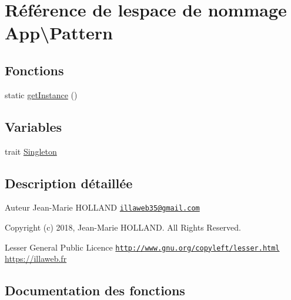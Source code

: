 \hypertarget{namespace_app_1_1_pattern}{}\section{Référence de l\textquotesingle{}espace de nommage App\textbackslash{}Pattern}
\label{namespace_app_1_1_pattern}
\subsection*{Fonctions}
\begin{DoxyCompactItemize}
\item 
static \hyperlink{namespace_app_1_1_pattern_a0c11e0e56c6a5589b98f956835d91862}{get\+Instance} ()
\end{DoxyCompactItemize}
\subsection*{Variables}
\begin{DoxyCompactItemize}
\item 
trait \hyperlink{namespace_app_1_1_pattern_a90c7994df18fc2d358849f9a46502bc1}{Singleton}
\end{DoxyCompactItemize}


\subsection{Description détaillée}
\begin{DoxyAuthor}{Auteur}
Jean-\/\+Marie H\+O\+L\+L\+A\+ND \href{mailto:illaweb35@gmail.com}{\tt illaweb35@gmail.\+com} 
\end{DoxyAuthor}
\begin{DoxyCopyright}{Copyright}
(c) 2018, Jean-\/\+Marie H\+O\+L\+L\+A\+ND. All Rights Reserved.
\end{DoxyCopyright}
Lesser General Public Licence \href{http://www.gnu.org/copyleft/lesser.html}{\tt http\+://www.\+gnu.\+org/copyleft/lesser.\+html} \hyperlink{}{https\+://illaweb.\+fr}

\subsection{Documentation des fonctions}
\mbox{\label{namespace_app_1_1_pattern_a0c11e0e56c6a5589b98f956835d91862}} 
